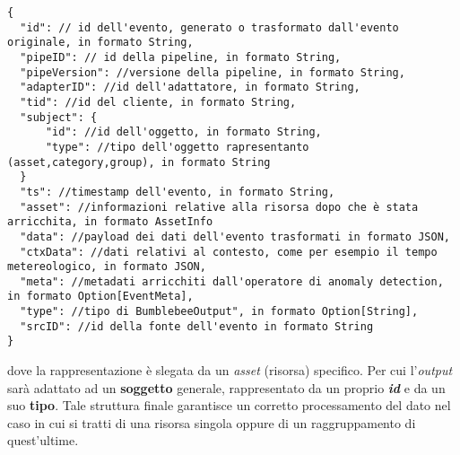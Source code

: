 \begin{verbatim}
{
  "id": // id dell'evento, generato o trasformato dall'evento originale, in formato String,
  "pipeID": // id della pipeline, in formato String,
  "pipeVersion": //versione della pipeline, in formato String,
  "adapterID": //id dell'adattatore, in formato String,
  "tid": //id del cliente, in formato String,
  "subject": {
	  "id": //id dell'oggetto, in formato String,
	  "type": //tipo dell'oggetto rapresentanto (asset,category,group), in formato String
  }
  "ts": //timestamp dell'evento, in formato String,
  "asset": //informazioni relative alla risorsa dopo che è stata arricchita, in formato AssetInfo
  "data": //payload dei dati dell'evento trasformati in formato JSON,
  "ctxData": //dati relativi al contesto, come per esempio il tempo metereologico, in formato JSON,
  "meta": //metadati arricchiti dall'operatore di anomaly detection, in formato Option[EventMeta],
  "type": //tipo di BumblebeeOutput", in formato Option[String],
  "srcID": //id della fonte dell'evento in formato String
}
\end{verbatim}
dove la rappresentazione è slegata da un \textit{asset} (risorsa) specifico. Per cui l'\textit{output} sarà adattato ad un \textbf{soggetto} generale, rappresentato da un proprio \textbf{\textit{id}} e da un suo \textbf{tipo}.
Tale struttura finale garantisce un corretto processamento del dato nel caso in cui si tratti di una risorsa singola oppure di un raggruppamento di quest'ultime.


